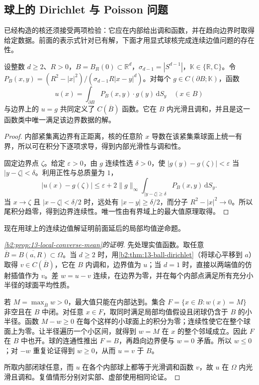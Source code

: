\subsection{球上的 Dirichlet 与 Poisson 问题}
\label{b2:subsec:13-ball-boundary}

已经构造的核还须接受两项检验：它应在内部给出调和函数，并在趋向边界时取得给定数据。前面的表示式针对已有解，下面才用显式球核完成连续边值问题的存在性。

\begin{theorem}\label{b2:thm:13-ball-dirichlet}
设整数 \(d\geq2\)、\(R>0\)，\(B=B_R(0)\subset\mathbb R^d\)，\(\sigma_{d-1}=|S^{d-1}|\)，\(\mathbb K\in\{\mathbb R,\mathbb C\}\)。令 \(P_B(x,y)=(R^2-|x|^2)/(\sigma_{d-1}R|x-y|^d)\)。对每个 \(g\in C(\partial B;\mathbb K)\)，函数
\[
 u(x)=\int_{\partial B}P_B(x,y)\cdot g(y)\,\mathrm{d}S_y\quad(x\in B)
\]
与边界上的 \(u=g\) 共同定义了 \(C(\overline B)\) 函数。它在 \(B\) 内光滑且调和，并且是这一函数类中唯一满足该边界数据的解。
\end{theorem}
\begin{proof}
内部紧集离边界有正距离，核的任意阶 \(x\) 导数在该紧集乘球面上统一有界，所以可在积分下逐项求导，得到内部光滑性与调和性。

固定边界点 \(\zeta\)。给定 \(\varepsilon>0\)，由 \(g\) 连续性选 \(\delta>0\)，使 \(|g(y)-g(\zeta)|<\varepsilon\) 当 \(|y-\zeta|<\delta\)。利用正性与总质量为 \(1\)，
\[
 |u(x)-g(\zeta)|
 \leq\varepsilon+2\|g\|_\infty
       \int_{|y-\zeta|\geq\delta}P_B(x,y)\,\mathrm{d}S_y.
\]
当 \(x\to\zeta\) 且 \(|x-\zeta|<\delta/2\) 时，远处有 \(|x-y|\geq\delta/2\)，而分子 \(R^2-|x|^2\to0\)。所以尾积分趋零，得到边界连续性。唯一性由有界域上的最大值原理取得。
\end{proof}

现在用球上的连续边值解证明前面延后的局部均值逆命题。

\begin{proof}[\cref{b2:prop:13-local-converse-mean}的证明]
先处理实值函数。取任意 \(\overline B=\overline{B(a,R)}\subset\Omega\)。当 \(d\geq2\) 时，用\cref{b2:thm:13-ball-dirichlet}（将球心平移到 \(a\)）取得 \(v\in C(\overline B)\)，它在 \(B\) 内调和，边界值为 \(u\)；当 \(d=1\) 时，直接以两端值的仿射插值作为 \(v\)。差 \(w=u-v\) 连续，在边界为零，并在每个内部点满足所有充分小半径的球面平均性质。

若 \(M=\max_{\overline B}w>0\)，最大值只能在内部达到。集合 \(F=\{x\in B:w(x)=M\}\) 非空且在 \(B\) 中闭。对任意 \(x\in F\)，取同时满足局部均值假设且闭球仍含于 \(B\) 的小半径。函数 \(M-w\geq0\) 在每个这样的小球面上的积分为零；连续性使它在整个球面上为零。让半径遍历一个小区间，就得到 \(w=M\) 在 \(x\) 的整个邻域成立。因此 \(F\) 在 \(B\) 中也开。球的连通性推出 \(F=B\)，再趋向边界便与 \(w=0\) 矛盾。所以 \(w\leq0\)；对 \(-w\) 重复论证得到 \(w\geq0\)，从而 \(u=v\) 于 \(B\)。

所取内部闭球任意，而 \(u\) 在各个内部球上都等于光滑调和函数 \(v\)，故 \(u\) 在 \(\Omega\) 内光滑且调和。复值情形分别对实部、虚部使用相同论证。
\end{proof}

